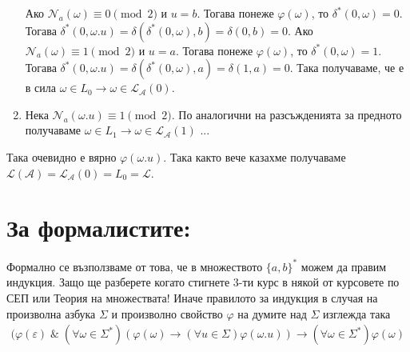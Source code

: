 \documentclass[12pt]{article}
\begin{document}
\begin{enumerate}
    Ако \(\mathcal{N}_a(\omega) \equiv 0 \pmod{2}\) и \(u = b\).
    Тогава понеже \(\varphi(\omega)\), то \(\delta^*(0, \omega) = 0\).
    Тогава \(\delta^*(0, \omega.u) = \delta(\delta^*(0, \omega), b) = \delta(0, b) = 0\).
    Ако \(\mathcal{N}_a(\omega) \equiv 1 \pmod{2}\) и \(u = a\).
    Тогава понеже \(\varphi(\omega)\), то \(\delta^*(0, \omega) = 1\).
    Тогава \(\delta^*(0, \omega.u) = \delta(\delta^*(0, \omega), a) = \delta(1, a) = 0\).
    Така получаваме, че е в сила \(\omega \in L_0 \longrightarrow \omega \in \mathcal{L}_\mathcal{A}(0)\).
    \item Нека \(\mathcal{N}_a(\omega.u) \equiv 1 \pmod{2}\). По аналогични на разсъжденията за предното получаваме \(\omega \in L_1 \longrightarrow \omega \in \mathcal{L}_\mathcal{A}(1)\) ...
\end{enumerate}
Така очевидно е вярно \(\varphi(\omega.u)\).
Така както вече казахме получаваме \\
\(\mathcal{L}(\mathcal{A}) = \mathcal{L}_\mathcal{A}(0) = L_0 = \mathcal{L}\).
\section*{За формалистите:}
Формално се възползваме от това, че в множеството \(\{a, b\}^*\) можем да правим индукция.
Защо ще разберете когато стигнете 3-ти курс в някой от курсовете по СЕП или Теория на множествата! Иначе правилото за индукция в случая на произволна азбука \(\Sigma\) и произволно свойство \(\varphi\) на думите над \(\Sigma\) изглежда така
\begin{align*}
    (\varphi(\varepsilon) \; \& \; (\forall \omega \in \Sigma^*)(\varphi(\omega) \longrightarrow (\forall u \in \Sigma) \varphi(\omega.u)) \longrightarrow (\forall \omega \in \Sigma^*)\varphi(\omega) 
\end{align*}
\end{document}
